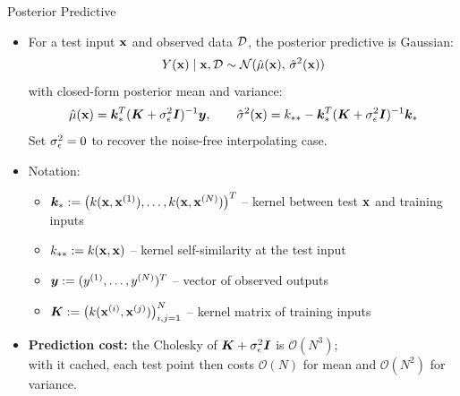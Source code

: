 \documentclass[main]{subfiles}
\begin{document}
\begin{frame}[t]{Posterior Predictive}
  \footnotesize
  \begin{itemize}
  \item For a test input $\mathbf{x}$ and observed data $\mathcal{D}$, the posterior predictive is Gaussian:
  $$Y(\mathbf{x}) \mid \mathbf{x}, \mathcal{D} \sim \mathcal{N}(\hat{\mu}(\mathbf{x}),\, \hat{\sigma}^2(\mathbf{x}))$$
  with closed-form posterior mean and variance:
  $$\hat{\mu}(\mathbf{x}) = \bm{k}_*^T (\bm{K} + \sigma_\epsilon^2 \bm{I})^{-1} \bm{y}, \qquad
    \hat{\sigma}^2(\mathbf{x}) = k_{**} - \bm{k}_*^T (\bm{K} + \sigma_\epsilon^2 \bm{I})^{-1} \bm{k}_*$$
  Set $\sigma_\epsilon^2 = 0$ to recover the noise-free interpolating case.
  \item Notation:
  \begin{itemize}
    \item $\bm{k}_* := \big(k(\mathbf{x}, \mathbf{x}^{(1)}), \ldots, k(\mathbf{x}, \mathbf{x}^{(N)})\big)^T$ -- kernel between test $\mathbf{x}$ and training inputs
    \item $k_{**} := k(\mathbf{x}, \mathbf{x})$ -- kernel self-similarity at the test input
    \item $\bm{y} := (y^{(1)}, \ldots, y^{(N)})^T$ -- vector of observed outputs
    \item $\bm{K} := \big(k(\mathbf{x}^{(i)}, \mathbf{x}^{(j)})\big)_{i,j=1}^N$ -- kernel matrix of training inputs
  \end{itemize}
  \item \textbf{Prediction cost:} the Cholesky of $\bm{K}+\sigma_\epsilon^2\bm{I}$ is $\mathcal{O}(N^3)$;\\
  with it cached, each test point then costs $\mathcal{O}(N)$ for mean and $\mathcal{O}(N^2)$ for variance.
\end{itemize}
\end{frame}
\end{document}
